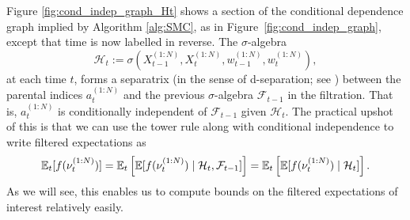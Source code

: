 Figure \ref{fig:cond_indep_graph_Ht} shows a section of the conditional dependence graph implied by Algorithm \ref{alg:SMC}, as in Figure~\ref{fig:cond_indep_graph}, except that time is now labelled in reverse. The $\sigma$-algebra
\begin{equation}\label{eq:defn_Ht}
\mathcal{H}_t := \sigma(X_{t-1}^{(1:N)}, X_t^{(1:N)}, w_{t-1}^{(1:N)}, w_t^{(1:N)} ) ,
\end{equation}
at each time $t$, forms a separatrix (in the sense of d-separation; see \textcite{verma1988}) between the parental indices $a_t^{(1:N)}$ and the previous $\sigma$-algebra $\mathcal{F}_{t-1}$ in the filtration. 
That is, $a_t^{(1:N)}$ is conditionally independent of $\mathcal{F}_{t-1}$ given $\mathcal{H}_t$.
The practical upshot of this is that we can use the tower rule along with conditional independence to write filtered expectations as
\begin{equation}
\mathbb{E}_t[ f(\nu_t^{(1:N)}) ] 
= \mathbb{E}_t\left[ \mathbb{E}[ f(\nu_t^{(1:N)}) \mid \mathcal{H}_t, \mathcal{F}_{t-1} ] \right] 
= \mathbb{E}_t\left[ \mathbb{E}[ f(\nu_t^{(1:N)}) \mid \mathcal{H}_t ] \right] . \label{eq:condexp_HtFt}
\end{equation}
As we will see, this enables us to compute bounds on the filtered expectations of interest relatively easily.

